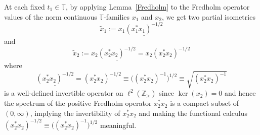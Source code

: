 \documentclass[pdftex]{sigma}
\begin{document}
At each fixed $t_{1}\in\mathbb{T}$, by applying Lemma~\ref{Fredholm} to the Fredholm
operator values of the norm continuous $\mathbb{T}$-families $x_{1}$ and
$x_{2}$, we get two partial isometries
\[
\tilde{x}_{1}:=x_{1}\underline{( x_{1}^{\ast}x_{1}) ^{-1/2}}
\]
and
\[
\tilde{x}_{2}:=x_{2}\underline{( x_{2}^{\ast}x_{2}) ^{-1/2}%
}=x_{2}( x_{2}^{\ast}x_{2}) ^{-1/2}%
\]
where
\[
\underline{( x_{2}^{\ast}x_{2}) ^{-1/2}}=( x_{2}^{\ast
}x_{2}) ^{-1/2}\equiv\big( ( x_{2}^{\ast}x_{2})
^{-1}\big) ^{1/2}\equiv\sqrt{( x_{2}^{\ast}x_{2}) ^{-1}}%
\]
is a well-defined invertible operator on $\ell^{2}( \mathbb{Z}_{\geq
}) $ since $\ker( x_{2}) =0$ and hence the spectrum of the
positive Fredholm operator $x_{2}^{\ast}x_{2}$ is a compact subset of $(
0,\infty) $, implying the invertibility of $x_{2}^{\ast}x_{2}$ and
making the functional calculus $( x_{2}^{\ast}x_{2})
^{-1/2}\equiv\big( ( x_{2}^{\ast}x_{2}) ^{-1}\big) ^{1/2}$ meaningful.
\end{document}
